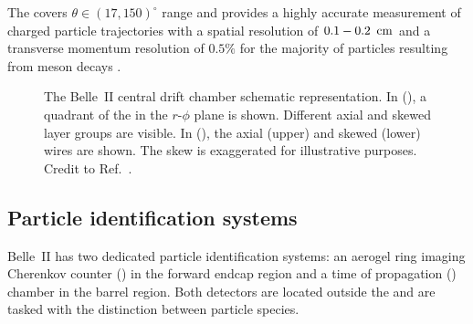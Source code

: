 The \CDC covers $\theta\in(17,150)^{\circ}$ range and provides a highly accurate measurement of charged particle trajectories with a spatial resolution of $0.1-0.2~{\rm \,cm}$
and a transverse momentum resolution of $0.5\%$ for the majority of particles resulting from \B meson decays \cite{Kandra:2019qlz}.

\begin{figure}[hbtp!]
    \centering
    \caption{\label{fig:cdc}
    The Belle~II central drift chamber schematic representation.
    In (), a quadrant of the \CDC in the $r$-$\phi$ plane is shown.
    Different axial and skewed layer groups are visible.
    In (), the axial (upper) and skewed (lower) wires are shown.
    The skew is exaggerated for illustrative purposes.
    Credit to Ref.~\cite{BelleIITrackingGroup:2020hpx}.
    }
\end{figure}

\subsection{Particle identification systems}\label{sec:pid}

Belle~II has two dedicated particle identification systems: an aerogel ring imaging Cherenkov counter (\ARICH) in the forward endcap region
and a time of propagation (\TOP) chamber in the barrel region. 
Both detectors are located outside the \CDC and are tasked with the distinction between particle species.

